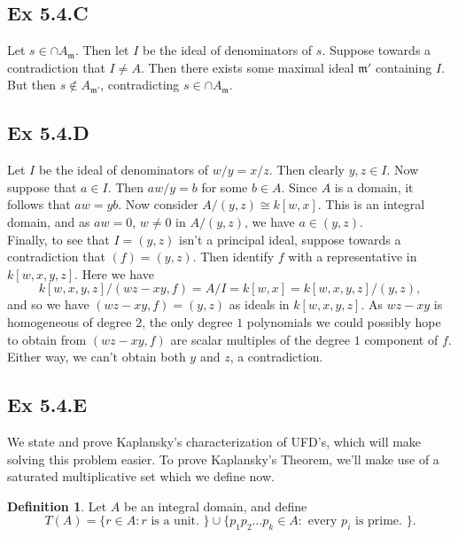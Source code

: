 \documentclass{article}
\theoremstyle{definition}
\newtheorem{definition}[theorem]{Definition}
\begin{document}
\subsection*{Ex 5.4.C}

Let $s \in \cap A_{\mathfrak{m}}$. Then let $I$ be the ideal of denominators of
$s$. Suppose towards a contradiction that $I \not = A$. Then there exists some
maximal ideal $\mathfrak{m}'$ containing $I$. But then $s \not \in
	A_{\mathfrak{m}'}$, contradicting $s \in \cap A_{\mathfrak{m}}$.

\subsection*{Ex 5.4.D}

Let $I$ be the ideal of denominators of $w/y = x/z$. Then clearly $y, z \in I$.
Now suppose that $a \in I$. Then $aw/y = b$ for some $b \in A$. Since $A$ is a
domain, it follows that $aw = yb$. Now consider $A/(y, z) \cong k[w, x]$. This
is an integral domain, and as $aw = 0,\, w \not = 0$ in $A/(y,z)$, we have $a
	\in (y, z)$. \\

Finally, to see that $I = (y, z)$ isn't a principal ideal, suppose towards a
contradiction that $(f) = (y, z)$. Then identify $f$ with a representative in
$k[w,x,y,z]$. Here we have
\[
	k[w,x,y,z]/(wz-xy, f)
	=
	A/I
	=
	k[w, x]
	=
	k[w, x, y, z]/(y, z),
\]
and so we have $(wz - xy, f) = (y, z)$ as ideals in $k[w,x,y,z]$. As $wz - xy$
is homogeneous of degree $2$, the only degree $1$ polynomials we could possibly
hope to obtain from $(wz - xy, f)$ are scalar multiples of the degree $1$
component of $f$. Either way, we can't obtain both $y$ and $z$, a contradiction.

\subsection*{Ex 5.4.E}

We state and prove Kaplansky's characterization of UFD's, which will make
solving this problem easier. To prove Kaplansky's Theorem, we'll make use of a
saturated multiplicative set which we define now.

\begin{definition}
	Let $A$ be an integral domain, and define
	\[
		T(A)
		=
		\{
		r \in A :
		r \text{ is a unit. }
		\}
		\cup
		\{
		p_1p_2 \ldots p_k \in A :
		\text{ every }
		p_i
		\text{ is prime. }
		\}.
	\]
\end{definition}
\end{document}
